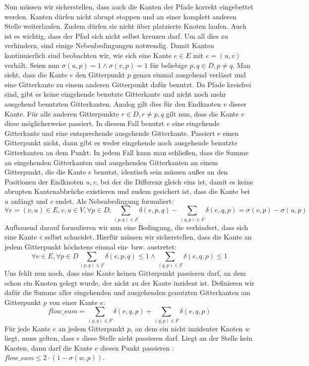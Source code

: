 \documentclass[bachelor, german]{algothesis}
\begin{document}
Nun müssen wir sicherstellen, dass auch die Kanten der Pfade korrekt eingebettet werden. Kanten dürfen nicht abrupt stoppen und an einer komplett anderen Stelle weiterlaufen. Zudem dürfen sie nicht über platzierte Knoten laufen. Auch ist es wichtig, dass der Pfad sich nicht selbst kreuzen darf. Um all dies zu verhindern, sind einige Nebenbedingungen notwendig. \newline
Damit Kanten kontinuierlich sind beobachten wir, wie sich eine Kante $e \in E$ mit $e = (u,v)$ verhält. Seien nun $\sigma(u,p) = 1 \land \sigma(v,p) = 1$ für beliebige $p,q \in D, p \neq q$. Man sieht, dass die Kante $e$ den Gitterpunkt $p$ genau einmal ausgehend verlässt und eine Gitterkante zu einem anderen Gitterpunkt dafür benutzt.  Da Pfade kreisfrei sind,  gibt es keine eingehende benutzte Gitterkante und nicht noch mehr ausgehend benutzten Gitterkanten. Analog gilt dies für den Endknoten $v$ dieser Kante. Für alle anderen Gitterpunkte $r \in D, r \neq p,q$ gilt nun, dass die Kante $e$ diese möglicherweise passiert. In diesem Fall benutzt $e$ eine eingehende Gitterkante und eine entsprechende ausgehende Gitterkante. Passiert $e$ einen Gitterpunkt nicht, dann gibt es weder eingehende noch ausgehende benutzte Gitterkanten an dem Punkt. In jedem Fall kann man schließen, dass die Summe an eingehenden Gitterkanten und ausgehenden Gitterkanten an einem Gitterpunkt, die die Kante $e$ benutzt, identisch sein müssen außer an den Positionen der Endknoten $u,v$, bei der die Differenz gleich eins ist, damit es keine abrupten Kantenabbrüche existieren und zudem gesichert ist, dass die Kante bei $u$ anfängt und $v$ endet. Als Nebenbedingung formuliert: $$\forall e=(v,u) \in E, v,u \in V, \forall p \in D: \sum_{(p,q) \in F} \delta(e,p,q) - \sum_{(q,p) \in F} \delta(e,q,p) = \sigma(v,p) - \sigma(u,p)$$
Aufbauend darauf formulieren wir nun eine Bedingung, die verhindert, dass sich eine Kante $e$ selbst schneidet. Hierfür müssen wir sicherstellen, dass die Kante an jedem Gitterpunkt höchstens einmal ein- bzw. austretet: $$\forall e \in E, \forall p \in D \sum_{(p,q) \in F} \delta(e,p,q) \leq 1 \land \sum_{(q,p) \in F} \delta(e,q,p) \leq 1$$
Uns fehlt nun noch, dass eine Kante keinen Gitterpunkt passieren darf, an dem schon ein Knoten gelegt wurde, der nicht zu der Kante inzident ist. Definieren wir dafür die Summe aller eingehenden und ausgehenden genutzten Gitterkanten am Gitterpunkt $p$ von einer Kante $e$: $$flow\_sum = \sum_{(p,q) \in F} \delta(e,q,p) + \sum_{(q,p) \in F} \delta(e,q,p)$$
Für jede Kante $e$ an jedem Gitterpunkt $p$, an dem ein nicht inzidenter Knoten $w$ liegt, muss gelten, dass $e$ diese Stelle nicht passieren darf. Liegt an der Stelle kein Knoten, dann darf die Kante $e$ diesen Punkt passieren : $flow\_sum \leq 2 \cdot (1 - \sigma(w,p))$. \newline
\end{document}
